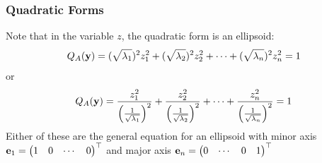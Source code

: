 \documentclass{beamer}
\begin{document}
\begin{frame}\frametitle{Quadratic Forms}
	\begin{proofcont}
		Note that in the variable $z$, the quadratic form is an ellipsoid:
		\[ 
			Q_A(\mathbf{y})= (\sqrt{\lambda_1})^2z_1^2 + (\sqrt{\lambda_2})^2z_2^2 + \cdots + (\sqrt{\lambda_n})^2z_n^2 = 1 
		\]
		or
		\[ 
			Q_A(\mathbf{y})= \frac{z_1^2}{\left(\frac{1}{\sqrt{\lambda_1}}\right)^2} + \frac{z_2^2}{\left(\frac{1}{\sqrt{\lambda_2}}\right)^2} + \cdots + \frac{z_n^2}{\left(\frac{1}{\sqrt{\lambda_n}}\right)^2} = 1
		\]
		Either of these are the general equation for an ellipsoid with minor axis 
		$\mathbf{e}_1 = 	\begin{pmatrix}
						1 & 0 & \cdots & 0 
				  	\end{pmatrix}^\top$ 
		and major axis 
		$\mathbf{e}_n = 	\begin{pmatrix} 
						0 & \cdots & 0 & 1
					\end{pmatrix}^\top$
	\end{proofcont}
\end{frame}
\end{document}
